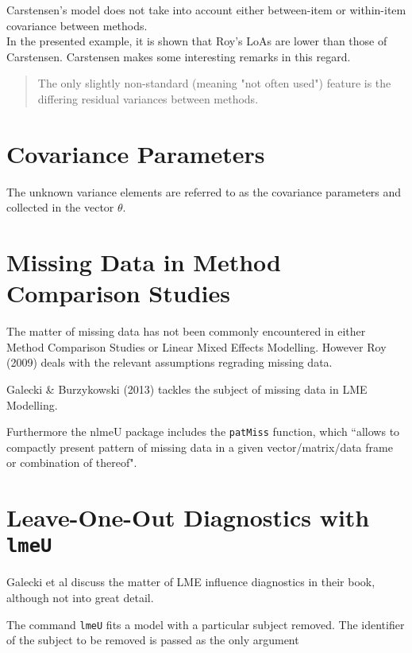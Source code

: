 \documentclass[12pt, a4paper]{report}
\theoremstyle{plain}
\theoremstyle{definition}
\theoremstyle{remark}
\begin{document}
Carstensen's model does not take into account either between-item or within-item covariance between methods.\\


In the presented example, it is shown that Roy's LoAs are lower than those of Carstensen.
Carstensen makes some interesting remarks in this regard.

\begin{quote}
	The only slightly non-standard (meaning "not often used") feature is the differing residual variances between methods.
\end{quote}
\newpage



\section{Covariance Parameters} %
The unknown variance elements are referred to as the covariance parameters and collected in the vector $\theta$.




\section{Missing Data in Method Comparison Studies}

The matter of missing data has not been commonly encountered in either Method Comparison Studies or Linear Mixed Effects Modelling. However Roy (2009) deals with the relevant assumptions regrading missing data.

Galecki \& Burzykowski (2013) tackles the subject of missing data in LME Modelling.

Furthermore the nlmeU package includes the \texttt{patMiss} function, which ``allows to compactly present pattern of missing data in a given vector/matrix/data
frame or combination of thereof".


\section{Leave-One-Out Diagnostics with \texttt{lmeU}}
Galecki et al discuss the matter of LME influence diagnostics in their book, although not into great detail.


The command \texttt{lmeU} fits a model with a particular subject removed. The identifier of the subject to be removed is passed as the only argument
\end{document}
